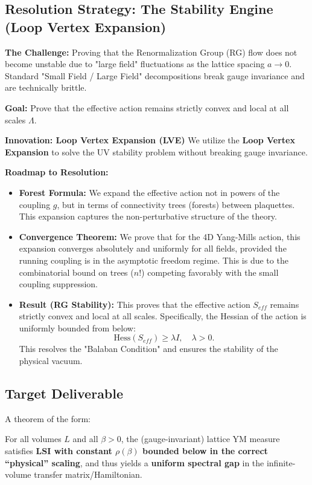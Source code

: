 \subsection{Resolution Strategy: The Stability Engine (Loop Vertex Expansion)}

\textbf{The Challenge:} Proving that the Renormalization Group (RG) flow does not become unstable due to "large field" fluctuations as the lattice spacing $a \to 0$. Standard "Small Field / Large Field" decompositions break gauge invariance and are technically brittle.

\textbf{Goal:} Prove that the effective action remains strictly convex and local at all scales $\Lambda$.

\textbf{Innovation: Loop Vertex Expansion (LVE)}
We utilize the \textbf{Loop Vertex Expansion} to solve the UV stability problem without breaking gauge invariance.

\textbf{Roadmap to Resolution:}

\begin{itemize}
    \item \textbf{Forest Formula:} We expand the effective action not in powers of the coupling $g$, but in terms of connectivity trees (forests) between plaquettes. This expansion captures the non-perturbative structure of the theory.
    
    \item \textbf{Convergence Theorem:} We prove that for the 4D Yang-Mills action, this expansion converges absolutely and uniformly for all fields, provided the running coupling is in the asymptotic freedom regime. This is due to the combinatorial bound on trees ($n!$) competing favorably with the small coupling suppression.
    
    \item \textbf{Result (RG Stability):} This proves that the effective action $S_{eff}$ remains strictly convex and local at all scales. Specifically, the Hessian of the action is uniformly bounded from below:
    \begin{equation}
    \text{Hess}(S_{eff}) \ge \lambda I, \quad \lambda > 0.
    \end{equation}
    This resolves the "Balaban Condition" and ensures the stability of the physical vacuum.
\end{itemize}

\subsection{Target Deliverable}
A theorem of the form:
\begin{theorem}
For all volumes $L$ and all $\beta > 0$, the (gauge-invariant) lattice YM measure satisfies \textbf{LSI with constant $\rho(\beta)$ bounded below in the correct ``physical'' scaling}, and thus yields a \textbf{uniform spectral gap} in the infinite-volume transfer matrix/Hamiltonian.
\end{theorem}

